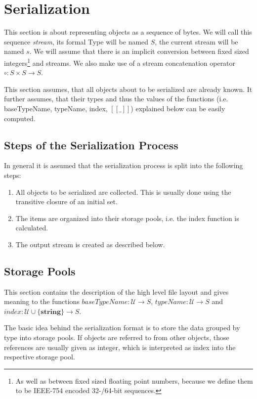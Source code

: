 \documentclass[a4paper,10pt]{article}
\newcommand{\den}[1]{[\![#1]\!]}
\begin{document}
\section{Serialization}
\label{serialization}

This section is about representing objects as a sequence of bytes. We will call this sequence \textit{stream}, its formal Type will be named $S$, the current stream will be named $s$. We will assume that there is an implicit conversion between fixed sized integers\footnote{As well as between fixed sized floating point numbers, because we define them to be IEEE-754 encoded 32-/64-bit sequences.} and streams. We also make use of a stream concatenation operator $\circ : S \times S → S$.

This section assumes, that all objects about to be serialized are already known. It further assumes, that their types and thus the values of the functions (i.e. baseTypeName, typeName, index, $\den{\_}$) explained below can be easily computed.


\subsection{Steps of the Serialization Process}

In general it is assumed that the serialization process is split into the following steps:
\begin{enumerate}
 \item All objects to be serialized are collected. This is usually done using the transitive closure of an initial set.
 
 \item The items are organized into their storage pools, i.e. the index function is calculated.
 
 \item The output stream is created as described below.
\end{enumerate}

\subsection{Storage Pools}

This section contains the description of the high level file layout and gives meaning to the functions $baseTypeName: \mathcal{U} → S$, $typeName: \mathcal{U} → S$ and $index: \mathcal{U}\cup\{\textbf{string}\} → S$.

The basic idea behind the serialization format is to store the data grouped by type into storage pools. If objects are referred to from other objects, those references are usually given as integer, which is interpreted as index into the respective storage pool.
\end{document}
